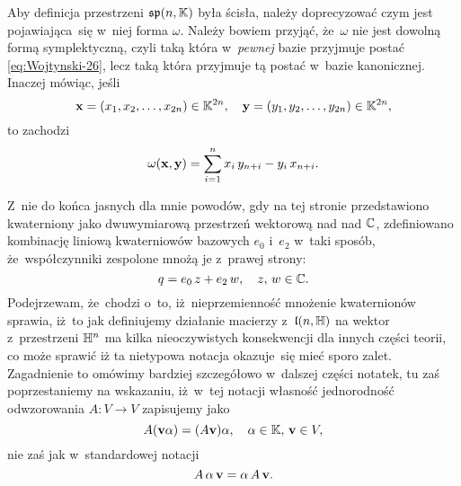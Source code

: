 \documentclass[a4paper,11pt]{article}
\begin{document}
 Aby definicja przestrzeni $\mathfrak{sp}( n, \mathbb{K} )$ była
ścisła, należy doprecyzować czym jest pojawiająca~się w~niej forma $\omega$.
Należy bowiem przyjąć, że~$\omega$ nie jest dowolną formą symplektyczną, czyli
taką która w~\textit{pewnej} bazie przyjmuje postać
\eqref{eq:Wojtynski-26}, lecz taką która przyjmuje tą postać w~bazie
kanonicznej. Inaczej mówiąc, jeśli
\begin{equation}
  \label{eq:Wojtynski-30}
  \mathbf{x} = ( x_{ 1 }, x_{ 2 }, \ldots, x_{ 2n } ) \in \mathbb{K}^{ 2n }, \quad
  \mathbf{y} = ( y_{ 1 }, y_{ 2 }, \ldots, y_{ 2n } ) \in \mathbb{K}^{ 2n },
\end{equation}
to zachodzi
\begin{equation}
  \label{eq:Wojtynski-31}
  \omega( \mathbf{x}, \mathbf{y} ) =
  \sum_{ i = 1 }^{ n } x_{ i } \, y_{ n + i } - y_{ i } \, x_{ n + i }.
\end{equation}

\vspace{\spaceFour}





 Z~nie do końca jasnych dla mnie powodów, gdy na tej stronie
przedstawiono kwaterniony jako dwuwymiarową przestrzeń wektorową nad nad
$\mathbb{C}$, zdefiniowano kombinację liniową kwaterniowów bazowych $e_{ 0 }$
i~$e_{ 2 }$ w~taki sposób, że~współczynniki zespolone mnożą je z~prawej
strony:
\begin{equation}
  \label{eq:Wojtynski-32}
  q = e_{ 0 } \, z + e_{ 2 } \, w, \quad z, \, w \in \mathbb{C}.
\end{equation}
Podejrzewam, że~chodzi o~to, iż~nieprzemienność mnożenie kwaternionów
sprawia, iż~to jak definiujemy działanie macierzy z~$\mathfrak{l}( n, \mathbb{H} )$ na
wektor z~przestrzeni $\mathbb{H}^{ n }$ ma kilka nieoczywistych konsekwencji dla
innych części teorii, co może sprawić iż ta nietypowa notacja okazuje~się
mieć sporo zalet. Zagadnienie to omówimy bardziej szczegółowo w~dalszej
części notatek, tu zaś poprzestaniemy na wskazaniu, iż~w~tej notacji
własność jednorodność odwzorowania $A : V \to V$ zapisujemy jako
\begin{equation}
  \label{eq:Wojtynski-33}
  A ( \mathbf{v} \alpha ) = ( A \mathbf{v} ) \alpha, \quad
  \alpha \in \mathbb{K}, \, \mathbf{v} \in V,
\end{equation}
nie zaś jak w~standardowej notacji
\begin{equation}
  \label{eq:Wojtynski-34}
  A \, \alpha \, \mathbf{v} = \alpha \, A \, \mathbf{v}.
\end{equation}
\end{document}
